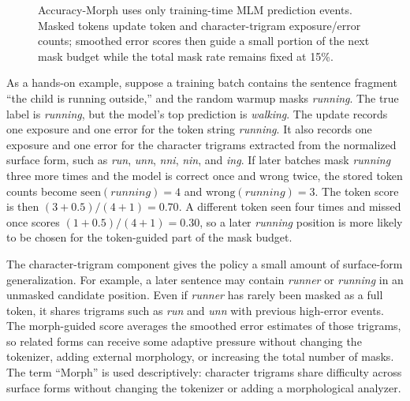 \documentclass[11pt]{article}
\begin{document}
\begin{figure}[t]
\centering
\scriptsize
{}
\caption{Accuracy-Morph uses only training-time MLM prediction events. Masked tokens update token and character-trigram exposure/error counts; smoothed error scores then guide a small portion of the next mask budget while the total mask rate remains fixed at 15\%.}
\label{fig:accuracy_morph_loop}
\end{figure}

As a hands-on example, suppose a training batch contains the sentence fragment ``the child is running outside,'' and the random warmup masks \textit{running}.
The true label is \textit{running}, but the model's top prediction is \textit{walking}.
The update records one exposure and one error for the token string \textit{running}.
It also records one exposure and one error for the character trigrams extracted from the normalized surface form, such as \textit{run}, \textit{unn}, \textit{nni}, \textit{nin}, and \textit{ing}.
If later batches mask \textit{running} three more times and the model is correct once and wrong twice, the stored token counts become $\mathrm{seen}(\textit{running})=4$ and $\mathrm{wrong}(\textit{running})=3$.
The token score is then $(3+0.5)/(4+1)=0.70$.
A different token seen four times and missed once scores $(1+0.5)/(4+1)=0.30$, so a later \textit{running} position is more likely to be chosen for the token-guided part of the mask budget.

The character-trigram component gives the policy a small amount of surface-form generalization.
For example, a later sentence may contain \textit{runner} or \textit{running} in an unmasked candidate position.
Even if \textit{runner} has rarely been masked as a full token, it shares trigrams such as \textit{run} and \textit{unn} with previous high-error events.
The morph-guided score averages the smoothed error estimates of those trigrams, so related forms can receive some adaptive pressure without changing the tokenizer, adding external morphology, or increasing the total number of masks.
The term ``Morph'' is used descriptively: character trigrams share difficulty across surface forms without changing the tokenizer or adding a morphological analyzer.
\end{document}
